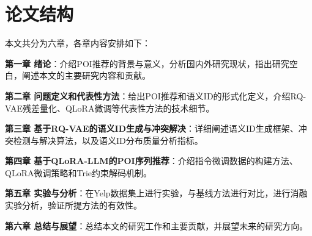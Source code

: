 \section{论文结构}
\label{sec:structure}

本文共分为六章，各章内容安排如下：

\textbf{第一章 绪论}：介绍POI推荐的背景与意义，分析国内外研究现状，指出研究空白，阐述本文的主要研究内容和贡献。

\textbf{第二章 问题定义和代表性方法}：给出POI推荐和语义ID的形式化定义，介绍RQ-VAE残差量化、QLoRA微调等代表性方法的技术细节。

\textbf{第三章 基于RQ-VAE的语义ID生成与冲突解决}：详细阐述语义ID生成框架、冲突检测与解决算法，以及语义ID分布质量分析指标。

\textbf{第四章 基于QLoRA-LLM的POI序列推荐}：介绍指令微调数据的构建方法、QLoRA微调策略和Trie约束解码机制。

\textbf{第五章 实验与分析}：在Yelp数据集上进行实验，与基线方法进行对比，进行消融实验分析，验证所提方法的有效性。

\textbf{第六章 总结与展望}：总结本文的研究工作和主要贡献，并展望未来的研究方向。
